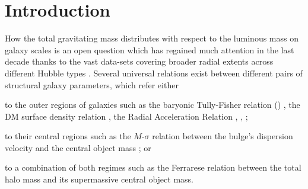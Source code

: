 \section{Introduction}

How the total gravitating mass 
distributes with respect to the luminous mass on galaxy scales is an 
open question which has regained much attention in the last decade thanks to the vast data-sets covering 
broader radial extents across different Hubble types \citep{2008AJ....136.2648D,2011MNRAS.413..813C,2016AJ....152..157L}.
Several universal relations exist between different pairs of structural galaxy parameters, which refer either \begin{inparaenum}[(i)]
    \item to the outer regions of galaxies such as the baryonic Tully-Fisher relation () \citep{2000ApJ...533L..99M}, the DM surface density relation \citep{2009MNRAS.397.1169D}, the Radial Acceleration Relation \citep{2016PhRvL.117t1101M}, , ; 
    \item to their central regions such as the $M$-$\sigma$ relation between the bulge's dispersion velocity and the central object mass \citep{2000ApJ...539L...9F}; or
    \item to a combination of both regimes such as the Ferrarese relation \citep{2002ApJ...578...90F,2011Natur.469..377K,2015ApJ...800..124B} between the total halo mass and its supermassive central object mass.
\end{inparaenum}

